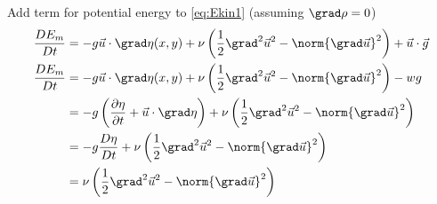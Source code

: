 \begin{derivation}
\label{der:Em}
Add term for potential energy to \eqref{eq:Ekin1} (assuming $\grad \rho=0$)
\begin{equation}\begin{split}
\frac{D E_{m}}{D t}
&=
-
g \vec{u} \cdot  \grad \eta(x,y)
+
\nu\left(
\frac{1}{2}\grad^2 \vec{u}^2 - \norm{\grad \vec{u}}^2
\right)
+
\vec{u}\cdot\vec{g}\\
\frac{D E_{m}}{D t}
&=
-
g \vec{u} \cdot  \grad \eta(x,y)
+
\nu\left(
\frac{1}{2}\grad^2 \vec{u}^2 - \norm{\grad \vec{u}}^2
\right)
-wg\\
&=
-
g \left( \frac{\partial \eta}{\partial t}
+
\vec{u} \cdot  \grad \eta \right)
+
\nu\left(
\frac{1}{2}\grad^2 \vec{u}^2 - \norm{\grad \vec{u}}^2
\right)\\
&=
-
g \frac{D \eta}{D t}
+
\nu\left(
\frac{1}{2}\grad^2 \vec{u}^2 - \norm{\grad \vec{u}}^2
\right)\\
&=
\nu\left(
\frac{1}{2}\grad^2 \vec{u}^2 - \norm{\grad \vec{u}}^2
\right)
\end{split}\end{equation}
\end{derivation}



